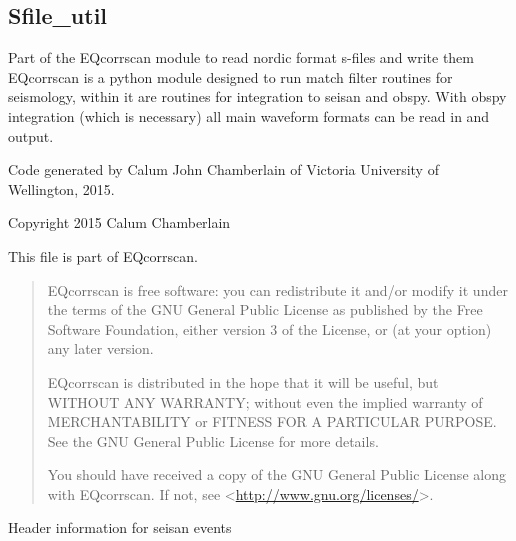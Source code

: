 \documentclass[a4paper,10pt,english]{sphinxmanual}
\begin{document}
\subsection{Sfile\_util}
\label{utils:module-Sfile_util}\label{utils:sfile-util}
Part of the EQcorrscan module to read nordic format s-files and write them
EQcorrscan is a python module designed to run match filter routines for
seismology, within it are routines for integration to seisan and obspy.
With obspy integration (which is necessary) all main waveform formats can be
read in and output.

Code generated by Calum John Chamberlain of Victoria University of Wellington,
2015.

Copyright 2015 Calum Chamberlain

This file is part of EQcorrscan.
\begin{quote}

EQcorrscan is free software: you can redistribute it and/or modify
it under the terms of the GNU General Public License as published by
the Free Software Foundation, either version 3 of the License, or
(at your option) any later version.

EQcorrscan is distributed in the hope that it will be useful,
but WITHOUT ANY WARRANTY; without even the implied warranty of
MERCHANTABILITY or FITNESS FOR A PARTICULAR PURPOSE.  See the
GNU General Public License for more details.

You should have received a copy of the GNU General Public License
along with EQcorrscan.  If not, see \textless{}\href{http://www.gnu.org/licenses/}{http://www.gnu.org/licenses/}\textgreater{}.
\end{quote}

\begin{fulllineitems}
\label{utils:Sfile_util.EVENTINFO}
Header information for seisan events

\end{fulllineitems}
\end{document}
